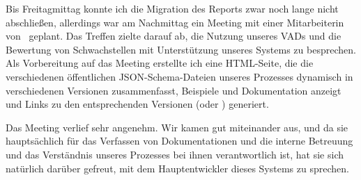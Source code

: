 
Bis Freitagmittag konnte ich die Migration des Reports zwar noch lange nicht abschließen, allerdings war am Nachmittag ein Meeting mit einer Mitarbeiterin von \aeclientZEZESE\ geplant.
Das Treffen zielte darauf ab, die Nutzung unseres VADs und die Bewertung von Schwachstellen mit Unterstützung unseres Systems zu besprechen.
Als Vorbereitung auf das Meeting erstellte ich eine HTML-Seite, die die verschiedenen öffentlichen JSON-Schema-Dateien unseres Prozesses dynamisch in verschiedenen Versionen zusammenfasst, Beispiele und Dokumentation anzeigt und Links zu den entsprechenden Versionen (oder ) generiert.

Das Meeting verlief sehr angenehm.
Wir kamen gut miteinander aus, und da sie hauptsächlich für das Verfassen von Dokumentationen und die interne Betreuung und das Verständnis unseres Prozesses bei ihnen verantwortlich ist, hat sie sich natürlich darüber gefreut, mit dem Hauptentwickler dieses Systems zu sprechen.
